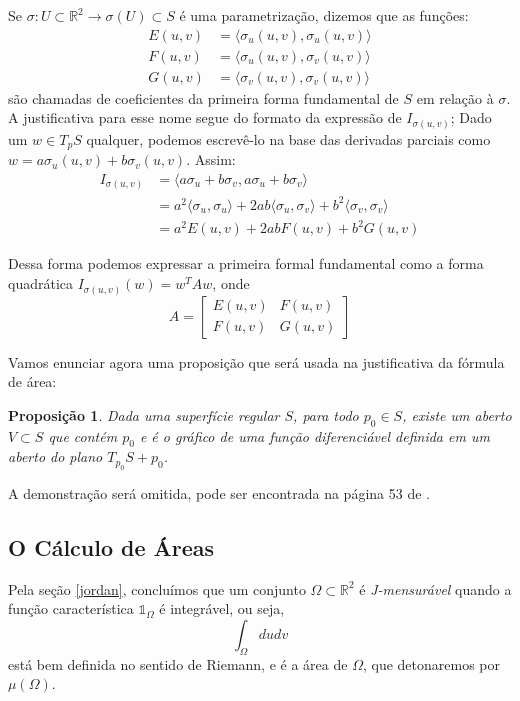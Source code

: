 \documentclass[12pt,letterpaper]{article}
\newtheorem{proposition}{Proposição}
\newcommand{\one}{\mathds{1}}
\newcommand{\rr}{\mathbb{R}^2}
\begin{document}
	Se $\sigma:U\subset\rr\to\sigma(U)\subset S$ é uma parametrização, dizemos que as funções:
	\begin{align*}
		E(u,v)&=\langle \sigma_u(u,v),\sigma_u(u,v)\rangle\\
		F(u,v)&=\langle \sigma_u(u,v),\sigma_v(u,v)\rangle\\
		G(u,v)&=\langle\sigma_v(u,v),\sigma_v(u,v)\rangle
	\end{align*}
	são chamadas de coeficientes da primeira forma fundamental de $S$ em relação à $\sigma$. A justificativa para esse nome segue do formato da expressão de $I_{\sigma(u,v)}$; Dado um $w\in T_pS$ qualquer, podemos escrevê-lo na base das derivadas parciais como $w=a\sigma_u(u,v)+b\sigma_v(u,v)$. Assim:
	\begin{align*}
		I_{\sigma(u,v)}&=\langle a\sigma_u+b\sigma_v,a\sigma_u+b\sigma_v\rangle\\
		&=a^2\langle\sigma_u,\sigma_u\rangle+2ab\langle\sigma_u,\sigma_v\rangle+b^2\langle\sigma_v,\sigma_v\rangle\\
		&=a^2E(u,v)+2abF(u,v)+b^2G(u,v)
	\end{align*}

	Dessa forma podemos expressar a primeira formal fundamental como a forma quadrática $I_{\sigma(u,v)}(w)=w^TAw$, onde 
	$$A=\begin{bmatrix}
		E(u,v)&F(u,v)\\
		F(u,v)&G(u,v)
	\end{bmatrix}$$
	
	Vamos enunciar agora uma proposição que será usada na justificativa da fórmula de área:
	
	\begin{proposition}
		\label{prop1}
		Dada uma superfície regular $S$, para todo $p_0\in S$, existe um aberto $V\subset S$ que contém $p_0$ e é o gráfico de uma função diferenciável definida em um aberto do plano $T_{p_0}S+p_0$.
	\end{proposition}
	 A demonstração será omitida, pode ser encontrada na página 53 de \cite{ronaldo}.
	\subsection{O Cálculo de Áreas}
		Pela seção \ref{jordan}, concluímos que um conjunto $\Omega\subset\rr$ é \textit{J-mensurável} quando a função característica $\one_\Omega$ é integrável, ou seja,
		$$\displaystyle\int_\Omega dudv$$
		está bem definida no sentido de Riemann, e é a área de $\Omega$, que detonaremos por $\mu(\Omega)$.
		
\end{document}
